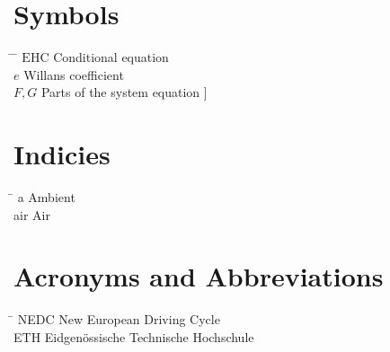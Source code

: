 \section*{Symbols}
\begin{tabbing}
 \hspace*{1.6cm} \= \hspace*{8cm} \= \kill
 $\mathrm{EHC}$ \> Conditional equation \> [$-$] \\[0.5ex]
 $e$ \> Willans coefficient \> [$-$] \\[0.5ex]
 $F,G$ \> Parts of the system equation \> [\unitfrac[]{K}{s}]
\end{tabbing}

\section*{Indicies}
\begin{tabbing}
 \hspace*{1.6cm}  \= \kill
 a \> Ambient \\[0.5ex]
 air \> Air
\end{tabbing}

\section*{Acronyms and Abbreviations}
\begin{tabbing}
 \hspace*{1.6cm}  \= \kill
 NEDC \> New European Driving Cycle \\[0.5ex]
 ETH \> Eidgen\"{o}ssische Technische Hochschule
\end{tabbing}

 \cleardoublepage

